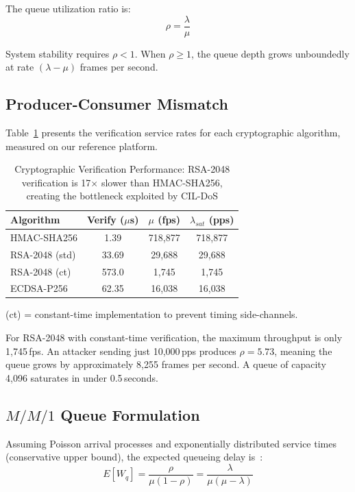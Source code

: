\documentclass[journal]{IEEEtran}
\begin{document}
The queue utilization ratio is:
\begin{equation}
\rho = \frac{\lambda}{\mu}
\end{equation}

System stability requires $\rho < 1$. When $\rho \geq 1$, the queue depth grows unboundedly at rate $(\lambda - \mu)$ frames per second.

\subsection{Producer-Consumer Mismatch}
Table~\ref{tab:service_rates} presents the verification service rates for each cryptographic algorithm, measured on our reference platform.

\begin{table}[t]
\caption{Cryptographic Verification Performance: RSA-2048 verification is 17$\times$ slower than HMAC-SHA256, creating the bottleneck exploited by CIL-DoS}
\label{tab:service_rates}
\centering
\small
\begin{tabular}{lccc}
\toprule
\textbf{Algorithm} & \textbf{Verify ($\mu$s)} & \textbf{$\mu$ (fps)} & \textbf{$\lambda_{sat}$ (pps)} \\
\midrule
HMAC-SHA256 & 1.39    & 718,877 & 718,877 \\
RSA-2048 (std) & 33.69   & 29,688  & 29,688 \\
RSA-2048 (ct) & 573.0   & 1,745   & 1,745 \\
ECDSA-P256  & 62.35   & 16,038  & 16,038 \\
\bottomrule
\end{tabular}
\vspace{1mm}
\small{(ct) = constant-time implementation to prevent timing side-channels.}
\end{table}

For RSA-2048 with constant-time verification, the maximum throughput is only 1,745\,fps. An attacker sending just 10,000\,pps produces $\rho = 5.73$, meaning the queue grows by approximately 8,255 frames per second. A queue of capacity 4,096 saturates in under 0.5\,seconds.

\subsection{$M/M/1$ Queue Formulation}
Assuming Poisson arrival processes and exponentially distributed service times (conservative upper bound), the expected queueing delay is~\cite{kleinrock1975queueing}:
\begin{equation}
E[W_q] = \frac{\rho}{\mu(1-\rho)} = \frac{\lambda}{\mu(\mu - \lambda)}
\end{equation}
\end{document}
